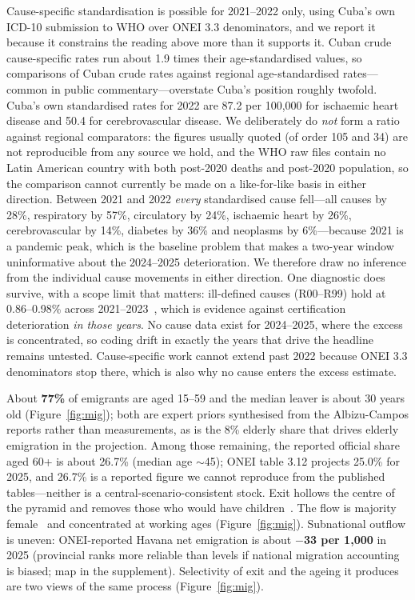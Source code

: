 \documentclass[11pt,a4paper]{article}
\begin{document}
Cause-specific standardisation is possible for 2021--2022 only, using Cuba's own ICD-10 submission to WHO over ONEI 3.3 denominators, and we report it because it constrains the reading above more than it supports it.
Cuban crude cause-specific rates run about 1.9 times their age-standardised values, so comparisons of Cuban crude rates against regional age-standardised rates---common in public commentary---overstate Cuba's position roughly twofold.
Cuba's own standardised rates for 2022 are 87.2 per 100{,}000 for ischaemic heart disease and 50.4 for cerebrovascular disease.
We deliberately do \emph{not} form a ratio against regional comparators: the figures usually quoted (of order 105 and 34) are not reproducible from any source we hold, and the WHO raw files contain no Latin American country with both post-2020 deaths and post-2020 population, so the comparison cannot currently be made on a like-for-like basis in either direction.
Between 2021 and 2022 \emph{every} standardised cause fell---all causes by 28\%, respiratory by 57\%, circulatory by 24\%, ischaemic heart by 26\%, cerebrovascular by 14\%, diabetes by 36\% and neoplasms by 6\%---because 2021 is a pandemic peak, which is the baseline problem that makes a two-year window uninformative about the 2024--2025 deterioration.
We therefore draw no inference from the individual cause movements in either direction.
One diagnostic does survive, with a scope limit that matters: ill-defined causes (R00--R99) hold at 0.86--0.98\% across 2021--2023~\citep{who_mortality_db}, which is evidence against certification deterioration \emph{in those years}. No cause data exist for 2024--2025, where the excess is concentrated, so coding drift in exactly the years that drive the headline remains untested.
Cause-specific work cannot extend past 2022 because ONEI 3.3 denominators stop there, which is also why no cause enters the excess estimate.

About \textbf{77\%} of emigrants are aged 15--59 and the median leaver is about 30 years old (Figure~\ref{fig:mig}); both are expert priors synthesised from the Albizu-Campos reports rather than measurements, as is the 8\% elderly share that drives elderly emigration in the projection.
Among those remaining, the reported official share aged 60+ is about 26.7\% (median age $\sim$45); ONEI table 3.12 projects 25.0\% for 2025, and 26.7\% is a reported figure we cannot reproduce from the published tables---neither is a central-scenario-consistent stock.
Exit hollows the centre of the pyramid and removes those who would have children~\citep{coleman2006,lee2014}.
The flow is majority female~\citep{albizu2025} and concentrated at working ages (Figure~\ref{fig:mig}).
Subnational outflow is uneven: ONEI-reported Havana net emigration is about \textbf{$-$33 per 1{,}000} in 2025 (provincial ranks more reliable than levels if national migration accounting is biased; map in the supplement).
Selectivity of exit and the ageing it produces are two views of the same process (Figure~\ref{fig:mig}).
\end{document}
